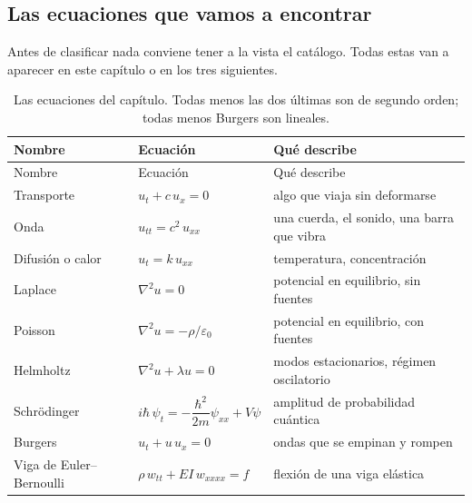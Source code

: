 \documentclass[
  spanish,
  a4paper,
]{scrbook}
\theoremstyle{definition}
\theoremstyle{plain}
\theoremstyle{definition}
\theoremstyle{plain}
\theoremstyle{definition}
\theoremstyle{remark}
\begin{document}
\subsection{Las ecuaciones que vamos a encontrar}\label{sec-catalogo}

Antes de clasificar nada conviene tener a la vista el catálogo. Todas
estas van a aparecer en este capítulo o en los tres siguientes.

\begin{longtable}[]{@{}
  >{\raggedright\arraybackslash}p{}
  >{\raggedright\arraybackslash}p{}
  >{\raggedright\arraybackslash}p{}@{}}
\caption{Las ecuaciones del capítulo. Todas menos las dos últimas son de
segundo orden; todas menos Burgers son
lineales.}\label{tbl-catalogo}\tabularnewline
\toprule\noalign{}
\begin{minipage}[b]{\linewidth}\raggedright
Nombre
\end{minipage} & \begin{minipage}[b]{\linewidth}\raggedright
Ecuación
\end{minipage} & \begin{minipage}[b]{\linewidth}\raggedright
Qué describe
\end{minipage} \\
\midrule\noalign{}
\endfirsthead
\toprule\noalign{}
\begin{minipage}[b]{\linewidth}\raggedright
Nombre
\end{minipage} & \begin{minipage}[b]{\linewidth}\raggedright
Ecuación
\end{minipage} & \begin{minipage}[b]{\linewidth}\raggedright
Qué describe
\end{minipage} \\
\midrule\noalign{}
\endhead
\bottomrule\noalign{}
\endlastfoot
Transporte & \(u_t + c\,u_x = 0\) & algo que viaja sin deformarse \\
Onda & \(u_{tt} = c^2\,u_{xx}\) & una cuerda, el sonido, una barra que
vibra \\
Difusión o calor & \(u_t = k\,u_{xx}\) & temperatura, concentración \\
Laplace & \(\nabla^2 u = 0\) & potencial en equilibrio, sin fuentes \\
Poisson & \(\nabla^2 u = -\rho/\varepsilon_0\) & potencial en
equilibrio, con fuentes \\
Helmholtz & \(\nabla^2 u + \lambda u = 0\) & modos estacionarios,
régimen oscilatorio \\
Schrödinger & \(i\hbar\,\psi_t = -\dfrac{\hbar^2}{2m}\psi_{xx} + V\psi\)
& amplitud de probabilidad cuántica \\
Burgers & \(u_t + u\,u_x = 0\) & ondas que se empinan y rompen \\
Viga de Euler--Bernoulli & \(\rho\,w_{tt} + EI\,w_{xxxx} = f\) & flexión
de una viga elástica \\
\end{longtable}
\end{document}
